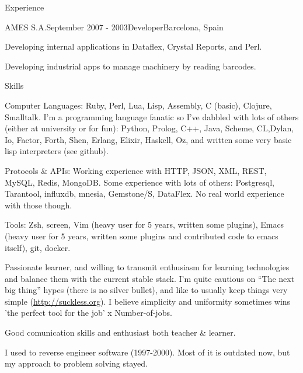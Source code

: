 \documentclass{resume} %
\begin{document}
\begin{rSection}{Experience}
\begin{rSubsection}{AMES S.A.}{September 2007 - 2003}{Developer}{Barcelona, Spain}
\item Developing internal applications in Dataflex, Crystal Reports, and Perl.
\item Developing industrial apps to manage machinery by reading barcodes.
\end{rSubsection}

\end{rSection}


\begin{rSection}{Skills}

\item Computer Languages: Ruby, Perl, Lua, Lisp, Assembly, C (basic),
  Clojure, Smalltalk.  I'm a programming language fanatic so I've
  dabbled with lots of others (either at university or for fun):
  Python, Prolog, C++, Java, Scheme, CL,Dylan, Io, Factor, Forth,
  Shen, Erlang, Elixir, Haskell, Oz, and written some very basic lisp
  interpreters (see github).

\item Protocols \& APIs: Working experience with HTTP, JSON, XML,
  REST, MySQL, Redis, MongoDB. Some experience with lots of others:
  Postgresql, Tarantool, influxdb, mnesia, Gemstone/S, DataFlex.  No
  real world experience with those though.

\item Tools: Zsh, screen, Vim (heavy user for 5 years, written some
  plugins), Emacs (heavy user for 5 years, written some plugins and
  contributed code to  emacs itself), git, docker.

\item Passionate learner, and willing to transmit enthusiasm for
  learning technologies and balance them with the current stable
  stack. I'm quite cautious on ``The next big thing'' hypes (there is
  no silver bullet), and like to usually keep things very simple
  (\url{http://suckless.org}). I believe simplicity and uniformity
  sometimes wins 'the perfect tool for the job' x Number-of-jobs.

\item Good comunication skills and enthusiast both teacher \& learner.
\item I used to reverse engineer software (1997-2000). Most of it is
  outdated now, but my approach to problem solving stayed.

\end{rSection}
\end{document}
